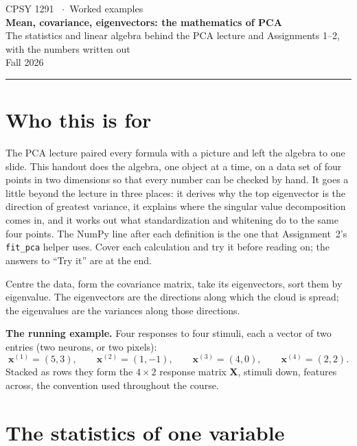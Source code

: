 \documentclass[11pt]{article}
\newcommand{\vx}{\bm{x}}
\newcommand{\mX}{\bm{X}}
\begin{document}
\begin{center}
{\sffamily\small\color{accent}CPSY 1291 \ $\cdot$\ Worked examples}\\[5pt]
{\sffamily\LARGE\bfseries\color{brown} Mean, covariance, eigenvectors: the mathematics of PCA}\\[3pt]
{\sffamily\large\color{ink} The statistics and linear algebra behind the PCA lecture and Assignments 1--2, with the numbers written out}\\[6pt]
{\color{lightgray}\small Fall 2026}
\end{center}
\vspace{4pt}\hrule\vspace{10pt}

\section*{Who this is for}

The PCA lecture paired every formula with a picture and left the algebra to one slide.
This handout does the algebra, one object at a time, on a data set of four points in two
dimensions so that every number can be checked by hand. It goes a little beyond the lecture
in three places: it derives why the top eigenvector is the direction of greatest variance,
it explains where the singular value decomposition comes in, and it works out what
standardization and whitening do to the same four points. The NumPy line after each
definition is the one that Assignment~2's \texttt{fit\_pca} helper uses. Cover each
calculation and try it before reading on; the answers to ``Try it'' are at the end.

\begin{keybox}
 Centre the data, form the covariance matrix, take its
eigenvectors, sort them by eigenvalue. The eigenvectors are the directions along which the
cloud is spread; the eigenvalues are the variances along those directions.
\end{keybox}

\textbf{The running example.} Four responses to four stimuli, each a vector of two
entries (two neurons, or two pixels):
\[
\vx^{(1)} = (5, 3),\qquad \vx^{(2)} = (1, -1),\qquad \vx^{(3)} = (4, 0),\qquad \vx^{(4)} = (2, 2).
\]
Stacked as rows they form the $4\times2$ response matrix $\mX$, stimuli down, features
across, the convention used throughout the course.

\section{The statistics of one variable}
\end{document}
